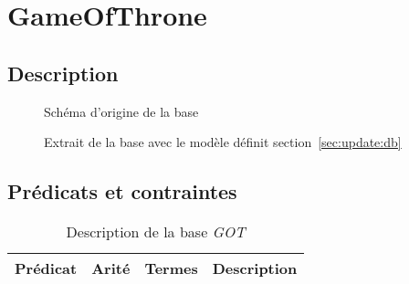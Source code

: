 \section{GameOfThrone}

\subsection{Description}

\begin{figure}[H]
    \caption{Schéma d'origine de la base }
\end{figure}

\begin{figure}[H]
    \caption{Extrait de la base  avec le modèle définit section~\ref{sec:update:db}}
\end{figure}

\subsection{Prédicats et contraintes}

\begin{table}[H]
    \centering
    \begin{adjustbox}{max width=\linewidth}
        \begin{tabular}{l|c|l|l}
            Prédicat & Arité & Termes & Description \\
            \hline
            \hline
        \end{tabular}
    \end{adjustbox}
    \caption{Description de la base \textit{GOT}}
\end{table}

